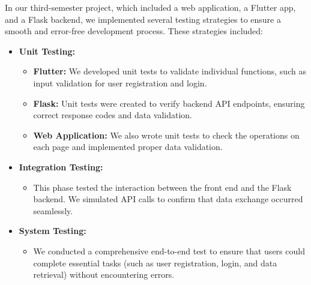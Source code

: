 \documentclass[a4paper,14pt]{article}
\begin{document}
{{{{{{{{{{{{		
		\vspace{0.5cm}
		
			{
			\noindent \normalsize
			\justifying In our third-semester project, which included a web application, a Flutter app, and a Flask backend, we implemented several testing strategies to ensure a smooth and error-free development process. These strategies included:
			
			\begin{itemize}
				\item \textbf{Unit Testing:}
				\begin{itemize}
					\item \textbf{Flutter:} We developed unit tests to validate individual functions, such as input validation for user registration and login.
					\item \textbf{Flask:} Unit tests were created to verify backend API endpoints, ensuring correct response codes and data validation.
					\item \textbf{Web Application:} We also wrote unit tests to check the operations on each page and implemented proper data validation.
				\end{itemize}
				
				\item \textbf{Integration Testing:}
				\begin{itemize}
					\item This phase tested the interaction between the front end and the Flask backend. We simulated API calls to confirm that data exchange occurred seamlessly.
				\end{itemize}
				
				\item \textbf{System Testing:}
				\begin{itemize}
					\item We conducted a comprehensive end-to-end test to ensure that users could complete essential tasks (such as user registration, login, and data retrieval) without encountering errors.
				\end{itemize}
				

\end{itemize}}}}}}}}}}}}}}
\end{document}
